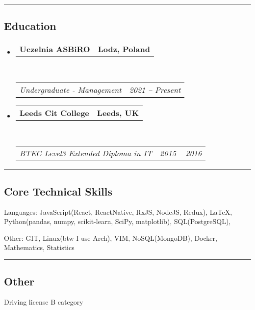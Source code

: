 \documentclass[10pt,letterpaper]{article}
\makeatletter
\newenvironment{indentsection}[1]%
{\begin{list}{}%
	{\setlength{\leftmargin}{#1}}%
	\item[]%
}
{\end{list}}
\newcommand{\headerrow}[2]
{\begin{tabular*}{\linewidth}{l@{\extracolsep{\fill}}r}
	#1 &
	#2 \\
\end{tabular*}}
\makeatother
\begin{document}
\hrule
\vspace{-0.4em}
\subsection*{Education}

\begin{itemize}
	\parskip=0.1em
	\item
	      \headerrow
	      {\textbf{Uczelnia ASBiRO}}
	      {\textbf{Lodz, Poland}}
	      \\
	      \headerrow
	      {\emph{Undergraduate - Management}}
	      {\emph{2021 -- Present}}
	\item
	      \headerrow
	      {\textbf{Leeds Cit College}}
	      {\textbf{Leeds, UK}}
	      \\
	      \headerrow
	      {\emph{BTEC Level3 Extended Diploma in IT}}
	      {\emph{2015 -- 2016}}
\end{itemize}


\hrule
\vspace{-0.4em}
\subsection*{Core Technical Skills}

\begin{indentsection}{\parindent}
	\begin{description*}
		\item[Languages:]
			JavaScript(React, ReactNative, RxJS, NodeJS, Redux), \LaTeX, Python(pandas, numpy, scikit-learn, SciPy, matplotlib), SQL(PostgreSQL),
		\item[Other:] GIT, Linux(btw I use Arch), VIM, NoSQL(MongoDB), Docker, Mathematics, Statistics
	\end{description*}
\end{indentsection}

\hrule
\vspace{-0.4em}
\subsection*{Other}
\begin{indentsection}{\parindent}
	\begin{description*}
		\item Driving license B category
	\end{description*}
\end{indentsection}
\end{document}
